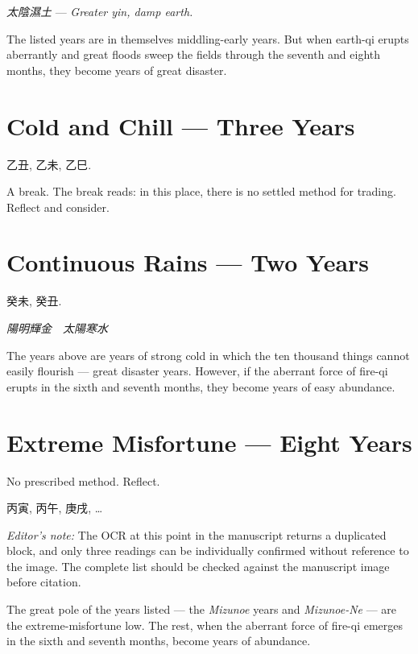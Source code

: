 \documentclass[10pt, openany]{book}
\newcommand{\jp}[1]{{\japanesefont #1}}
\newenvironment{editorialnote}{%
  \begin{editorbox}\small\textit{Editor's note:}\enspace}{\end{editorbox}}
\begin{document}
\begin{center}
\textit{\jp{太陰濕土}} --- \textit{Greater yin, damp earth.}
\end{center}

The listed years are in themselves middling-early years. But when
earth-qi erupts aberrantly and great floods sweep the fields
through the seventh and eighth months, they become years of great
disaster.

\section{Cold and Chill --- Three Years}

\jp{乙丑}, \jp{乙未}, \jp{乙巳}.

A break. The break reads: in this place, there is no settled method
for trading. Reflect and consider.

\section{Continuous Rains --- Two Years}

\jp{癸未}, \jp{癸丑}.

\begin{center}
\textit{\jp{陽明輝金　太陽寒水}}
\end{center}

The years above are years of strong cold in which the ten thousand
things cannot easily flourish --- great disaster years. However,
if the aberrant force of fire-qi erupts in the sixth and seventh
months, they become years of easy abundance.

\section{Extreme Misfortune --- Eight Years}

No prescribed method. Reflect.

\jp{丙寅}, \jp{丙午}, \jp{庚戌}, \ldots

\begin{editorialnote}
The OCR at this point in the manuscript returns a duplicated block,
and only three readings can be individually confirmed without
reference to the image. The complete list should be checked
against the manuscript image before citation.
\end{editorialnote}

The great pole of the years listed --- the \textit{Mizunoe} years
and \textit{Mizunoe-Ne} --- are the extreme-misfortune low. The
rest, when the aberrant force of fire-qi emerges in the sixth and
seventh months, become years of abundance.
\end{document}
